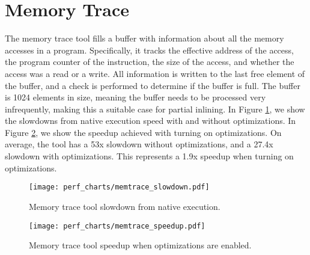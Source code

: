 \section{Memory Trace}

The memory trace tool fills a buffer with information about all the memory
accesses in a program.  Specifically, it tracks the effective address of the
access, the program counter of the instruction, the size of the access, and
whether the access was a read or a write.  All information is written to the
last free element of the buffer, and a check is performed to determine if the
buffer is full.  The buffer is 1024 elements in size, meaning the buffer needs
to be processed very infrequently, making this a suitable case for partial
inlining.  In Figure \ref{fig:memtrace_slowdown}, we show the slowdowns from
native execution speed with and without optimizations.  In Figure
\ref{fig:memtrace_speedup}, we show the speedup achieved with turning on
optimizations.  On average, the tool has a 53x slowdown without optimizations,
and a 27.4x slowdown with optimizations.  This represents a 1.9x speedup when
turning on optimizations.

\begin{figure}
\texttt{[image: perf\_charts/memtrace\_slowdown.pdf]}
\caption{Memory trace tool slowdown from native execution.}
\label{fig:memtrace_slowdown}
\end{figure}

\begin{figure}
\texttt{[image: perf\_charts/memtrace\_speedup.pdf]}
\caption{Memory trace tool speedup when optimizations are enabled.}
\label{fig:memtrace_speedup}
\end{figure}
